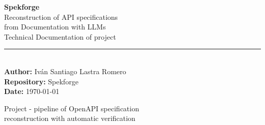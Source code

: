 \documentclass[11pt,a4paper]{report}
\begin{document}

\begin{titlepage}
    \centering
    \vspace*{2cm}

    {\Huge \textbf{Spekforge}}\\[0.7cm]
    {\Large Reconstruction of API specifications\\ from Documentation with LLMs} \\[2cm]

    {\large Technical Documentation of project}\\[3cm]

    \rule{0.8\textwidth}{0.4pt}\\[1cm]

    {\large \textbf{Author:} Iván Santiago Lastra Romero} \\[0.3cm]
    {\large \textbf{Repository:} Spekforge} \\[0.3cm]
    {\large \textbf{Date:} \today}\\

    \vfill

    {\normalsize Project - pipeline of OpenAPI specification\\
     reconstruction with automatic verification}
    
    \vspace{1cm}
\end{titlepage}

\tableofcontents
\newpage





\end{document}
